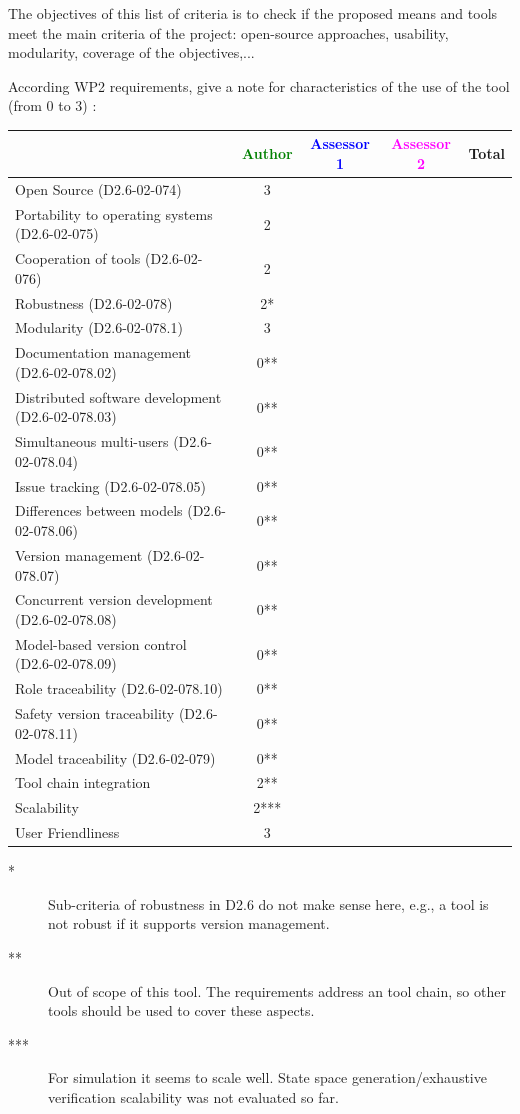 The objectives of this list of criteria is to check if the proposed means and tools meet the main criteria of the project: open-source approaches, usability, modularity, coverage of the objectives,...

According WP2 requirements, give a note for characteristics of the use of the tool (from 0 to 3) :

\begin{tabular}{|l | c | c | c | c|}
\hline
& \textcolor{green}{Author} & \textcolor{blue}{Assessor 1} & \textcolor{magenta}{Assessor 2} & Total \\
\hline 
Open Source (D2.6-02-074) & 3& & &  \\
\hline 
Portability to operating systems (D2.6-02-075) & 2& & &  \\
\hline
Cooperation of tools (D2.6-02-076) & 2& & &  \\
\hline
Robustness (D2.6-02-078) & 2*& & & \\
\hline
Modularity (D2.6-02-078.1) &3 & & & \\
\hline
Documentation management (D2.6-02-078.02) &0** & & & \\
\hline
Distributed software development (D2.6-02-078.03)  &0** & & & \\
\hline
Simultaneous multi-users (D2.6-02-078.04)   &0** & & & \\
\hline
Issue tracking (D2.6-02-078.05) &0** & & & \\
\hline
Differences between models (D2.6-02-078.06) &0** & & & \\
\hline
Version management (D2.6-02-078.07) &0** & & & \\
\hline
Concurrent version development (D2.6-02-078.08) &0** & & & \\
\hline
Model-based version control (D2.6-02-078.09) &0** & & & \\
\hline
Role traceability (D2.6-02-078.10) &0** & & & \\
\hline
Safety version traceability (D2.6-02-078.11) &0** & & & \\
\hline
Model traceability (D2.6-02-079) &0** & & & \\
\hline
Tool chain integration &2** & & & \\
\hline
Scalability &2*** & & & \\
\hline
User Friendliness &3 & & & \\
\hline
\end{tabular}

\begin{author_comment}
\begin{description}
\item[*] Sub-criteria of robustness in D2.6 do not make sense here, e.g., a tool is not robust if it supports version management.
\item[**] Out of scope of this tool. The requirements address an tool chain, so other tools should be used to cover these aspects.
\item[***] For simulation it seems to scale well. State space generation/exhaustive verification scalability was not evaluated so far.
\end{description}
\end{author_comment}


